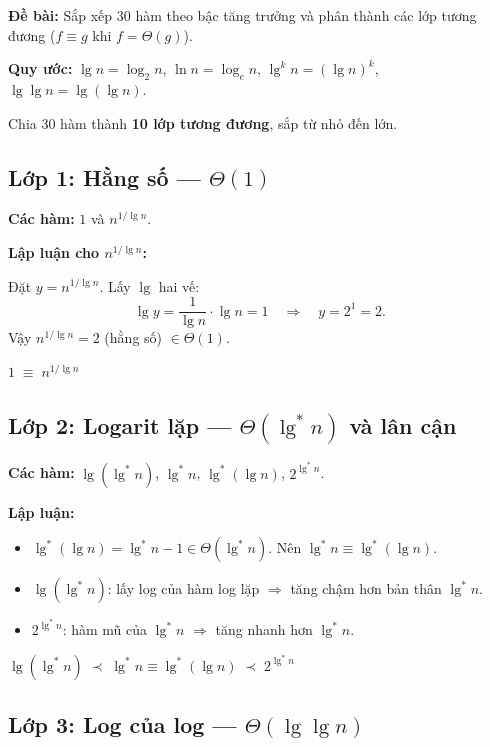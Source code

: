 ﻿\documentclass[12pt,a4paper]{article}
\begin{document}
\textbf{Đề bài:} Sắp xếp 30 hàm theo bậc tăng trưởng và phân thành các lớp tương đương
($f \equiv g$ khi $f = \Theta(g)$).

\textbf{Quy ước:} $\lg n = \log_2 n$, \; $\ln n = \log_e n$, \; $\lg^k n = (\lg n)^k$, \; $\lg\lg n = \lg(\lg n)$.

\bigskip

Chia 30 hàm thành \textbf{10 lớp tương đương}, sắp từ nhỏ đến lớn.

\subsection{Lớp 1: Hằng số --- $\Theta(1)$}

\textbf{Các hàm:} $1$ \;\; và \;\; $n^{1/\lg n}$.

\textbf{Lập luận cho $n^{1/\lg n}$:}

Đặt $y = n^{1/\lg n}$. Lấy $\lg$ hai vế:
\[
  \lg y = \frac{1}{\lg n} \cdot \lg n = 1
  \quad\Longrightarrow\quad y = 2^1 = 2.
\]
Vậy $n^{1/\lg n} = 2$ (hằng số) $\in \Theta(1)$.

\begin{resultbox}
$1 \;\equiv\; n^{1/\lg n}$
\end{resultbox}

\subsection{Lớp 2: Logarit lặp --- $\Theta(\lg^* n)$ và lân cận}

\textbf{Các hàm:} $\lg(\lg^* n)$, \;\; $\lg^* n$, \;\; $\lg^*(\lg n)$, \;\; $2^{\lg^* n}$.

\textbf{Lập luận:}
\begin{itemize}
  \item $\lg^*(\lg n) = \lg^* n - 1 \in \Theta(\lg^* n)$.
    Nên $\lg^* n \equiv \lg^*(\lg n)$.
  \item $\lg(\lg^* n)$: lấy log của hàm log lặp $\Rightarrow$ tăng chậm hơn bản thân $\lg^* n$.
  \item $2^{\lg^* n}$: hàm mũ của $\lg^* n$ $\Rightarrow$ tăng nhanh hơn $\lg^* n$.
\end{itemize}

\begin{resultbox}
$\lg(\lg^* n)
\;\prec\; \lg^* n \equiv \lg^*(\lg n)
\;\prec\; 2^{\lg^* n}$
\end{resultbox}

\subsection{Lớp 3: Log của log --- $\Theta(\lg\lg n)$}
\end{document}
